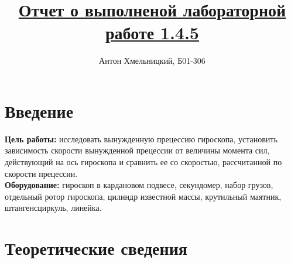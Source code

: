\documentclass[a4paper]{article}
\title{\underline{Отчет о выполненой лабораторной работе 1.4.5}}
\author{Антон Хмельницкий, Б01-306}
\begin{document}
\maketitle
	
	\section{Введение}
	
	\textbf{Цель работы:} исследовать вынужденную прецессию гироскопа, установить зависимость скорости вынужденной прецессии от величины момента сил, действующий на ось гироскопа и сравнить ее со скоростью, рассчитанной по скорости прецессии.\\
	\textbf{Оборудование:} гироскоп в кардановом подвесе, секундомер, набор грузов, отдельный ротор гироскопа, цилиндр известной массы, крутильный маятник, штангенсциркуль, линейка.
	
	\section{Теоретические сведения}
	
\end{document}
